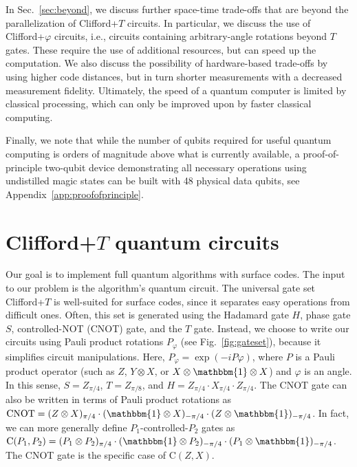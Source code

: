 \documentclass[prx,aps,letterpaper,twocolumn,allowfontchageintitle=true,accepted=2019-02-01]{quantumarticle}
\begin{document}
In Sec.~\ref{sec:beyond}, we discuss further space-time trade-offs that are beyond the parallelization of Clifford+$T$ circuits. In particular, we discuss the use of Clifford+$\varphi$ circuits, i.e., circuits containing arbitrary-angle rotations beyond $T$ gates. These require the use of additional resources, but can speed up the computation. We also discuss the possibility of hardware-based trade-offs by using higher code distances, but in turn shorter measurements with a decreased measurement fidelity. Ultimately, the speed of a quantum computer is limited by classical processing, which can only be improved upon by faster classical computing.

Finally, we note that while the number of qubits
required for useful quantum computing is orders of magnitude above what is currently available, a proof-of-principle two-qubit device demonstrating all necessary operations using undistilled magic states can be built with 48 physical data qubits, see Appendix~\ref{app:proofofprinciple}. 




\section{Clifford+$T$ quantum circuits}
\label{sec:circuits}

Our goal is to implement full quantum algorithms with surface codes. The input to our problem is the algorithm's quantum circuit. The universal gate set Clifford+$T$ is well-suited for surface codes, since it separates easy operations from difficult ones. Often, this set is generated using the Hadamard gate $H$, phase gate $S$, controlled-NOT (CNOT) gate, and the $T$ gate. Instead, we choose to write our circuits using Pauli product rotations $P_\varphi$ (see Fig.~\ref{fig:gateset}), because it simplifies circuit manipulations. Here, $P_\varphi = \exp(-iP\varphi)$, where $P$ is a Pauli product operator (such as $Z$, $Y\otimes X$, or $X \otimes \mathbbm{1} \otimes X$) and $\varphi$ is an angle. In this sense, $S=Z_{\pi/4}$, $T=Z_{\pi/8}$, and $H=Z_{\pi/4}\cdot X_{\pi/4} \cdot Z_{\pi/4}$. The CNOT gate can also be written in terms of Pauli product rotations as $\mathrm{CNOT}=(Z\otimes X)_{\pi/4} \cdot (\mathbbm{1}\otimes X)_{-\pi/4} \cdot (Z\otimes \mathbbm{1})_{-\pi/4}$. In fact, we can more generally define $P_1$-controlled-$P_2$ gates as $\mathrm{C}(P_1,P_2) = (P_1\otimes P_2)_{\pi/4} \cdot (\mathbbm{1}\otimes P_2)_{-\pi/4} \cdot (P_1\otimes \mathbbm{1})_{-\pi/4}$. The CNOT gate is the specific case of $\mathrm{C}(Z,X)$.
\end{document}
